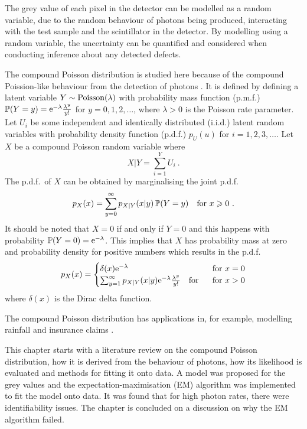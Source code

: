 The grey value of each pixel in the detector can be modelled as a random variable, due to the random behaviour of photons being produced, interacting with the test sample and the scintillator in the detector. By modelling using a random variable, the uncertainty can be quantified and considered when conducting inference about any detected defects.

The compound Poisson distribution is studied here because of the compound Poission-like behaviour from the detection of photons \citep{whiting2002signal, elbakri2003efficient, whiting2006properties}. It is defined by defining a latent variable $Y\sim\operatorname{Poisson}(\lambda)$ with probability mass function (p.m.f.) $\operatorname{\mathbb{P}}(Y=y)=\mathrm{e}^{-\lambda}\frac{\lambda^y}{y!}$ for $y=0,1,2,\dotsc$, where $\lambda>0$ is the Poisson rate parameter. Let $U_i$ be some independent and identically distributed (i.i.d.) latent random variables with probability density function (p.d.f.) $p_U(u)$ for $i=1,2,3,\dotsc$. Let $X$ be a compound Poisson random variable where
\begin{equation}
  X|Y = \sum_{i=1}^{Y}U_i \ .
  \label{eq:compoundPoisson_X|Y}
\end{equation}
The p.d.f.~of $X$ can be obtained by marginalising the joint p.d.f.
\begin{equation}
  p_X(x)=\sum_{y=0}^\infty p_{X|Y}(x|y)\operatorname{\mathbb{P}}(Y=y) \quad\text{for }x\geqslant 0
  \ .
\end{equation}
It should be noted that $X=0$ if and only if $Y=0$ and this happens with probability $\operatorname{\mathbb{P}}(Y=0)=\mathrm{e}^{-\lambda}$. This implies that $X$ has probability mass at zero and probability density for positive numbers which results in the p.d.f.
\begin{equation}
  p_X(x) = 
  \begin{cases}
    \delta(x) \mathrm{e}^{-\lambda}  & \text{ for } x=0 \\ 
    \sum_{y=1}^\infty p_{X|Y}(x|y)\mathrm{e}^{-\lambda}\frac{\lambda^y}{y!} \quad\text{for } & \text{ for } x>0
  \end{cases}
\end{equation}
where $\delta(x)$ is the Dirac delta function.

The compound Poisson distribution has applications in, for example, modelling rainfall \citep{revfeim1984initial} and insurance claims \citep{jorgensen1994fitting, smyth2002fitting}.

This chapter starts with a literature review on the compound Poisson distribution, how it is derived from the behaviour of photons, how its likelihood is evaluated and methods for fitting it onto data. A model was proposed for the grey values and the expectation-maximisation (EM) algorithm was implemented to fit the model onto data. It was found that for high photon rates, there were identifiability issues. The chapter is concluded on a discussion on why the EM algorithm failed.

